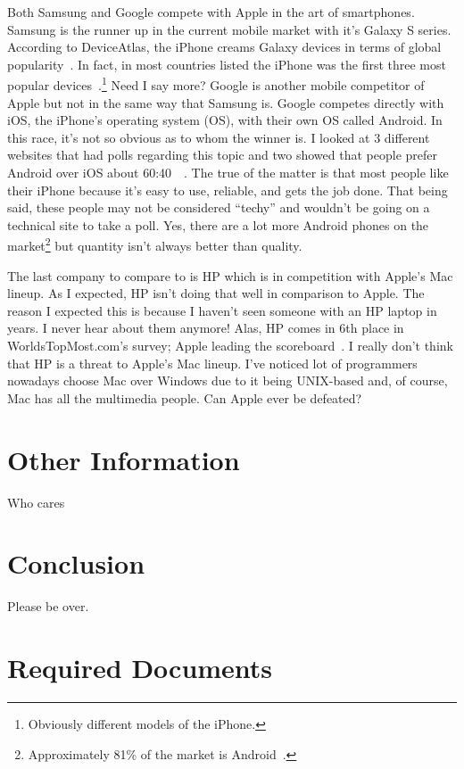 \documentclass[12pt,a4paper,titlepage]{article}
\begin{document}
Both Samsung and Google compete with Apple in the art of smartphones. Samsung is
the runner up in the current mobile market with it's Galaxy S series. According
to DeviceAtlas, the iPhone creams Galaxy devices in terms of global
popularity~\cite{smartphones}. In fact, in most countries listed the iPhone was
the first three most popular devices~\cite{smartphones}.\footnote{Obviously
  different models of the iPhone.} Need I say more? Google is another mobile
competitor of Apple but not in the same way that Samsung is. Google competes
directly with iOS, the iPhone's operating system (OS), with their own OS called
Android. In this race, it's not so obvious as to whom the winner is. I looked at
3 different websites that had polls regarding this topic and two showed that
people prefer Android over iOS about 60:40~\cite{poll1}~\cite{poll2}. The true
of the matter is that most people like their iPhone because it's easy to use,
reliable, and gets the job done. That being said, these people may not be
considered ``techy'' and wouldn't be going on a technical site to take a
poll. Yes, there are a lot more Android phones on the
market\footnote{Approximately 81\% of the market is Android~\cite{verge}.} but
quantity isn't always better than quality.

The last company to compare to is HP which is in competition with Apple's Mac
lineup. As I expected, HP isn't doing that well in comparison to Apple. The
reason I expected this is because I haven't seen someone with an HP laptop in
years. I never hear about them anymore! Alas, HP comes in 6th place in
WorldsTopMost.com's survey; Apple leading the scoreboard~\cite{most}. I really
don't think that HP is a threat to Apple's Mac lineup. I've noticed lot of
programmers nowadays choose Mac over Windows due to it being UNIX-based and, of
course, Mac has all the multimedia people. Can Apple ever be defeated?

\newpage

\section{Other Information}
Who cares

\section{Conclusion}
Please be over.

\newpage

\section{Required Documents}
\end{document}
